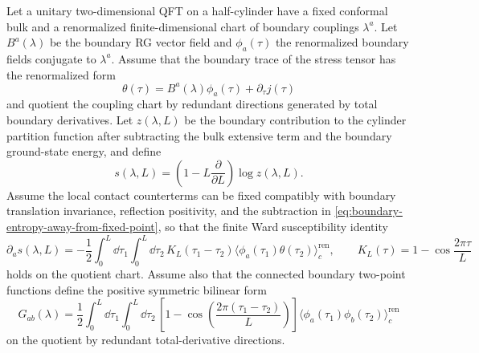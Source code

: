 \begin{hypothesis}
\label{hyp:boundary-entropy-gradient-input}
Let a unitary two-dimensional QFT on a half-cylinder have a fixed conformal
bulk and a renormalized finite-dimensional chart of boundary couplings
\(\lambda^a\).  Let \(B^a(\lambda)\) be the boundary RG vector field and
\(\phi_a(\tau)\) the renormalized boundary fields conjugate to
\(\lambda^a\).  Assume that the boundary trace of the stress tensor has the
renormalized form
\begin{equation}
  \theta(\tau)
  =
  B^a(\lambda)\phi_a(\tau)+\partial_\tau j(\tau)
  \label{eq:boundary-trace-beta-fields}
\end{equation}
and quotient the coupling chart by redundant directions generated by total
boundary derivatives.  Let \(z(\lambda,L)\) be the boundary contribution to
the cylinder partition function after subtracting the bulk extensive term and
the boundary ground-state energy, and define
\begin{equation}
  s(\lambda,L)
  =
  \left(1-L\frac{\partial}{\partial L}\right)\log z(\lambda,L).
  \label{eq:boundary-entropy-away-from-fixed-point}
\end{equation}
Assume the local contact counterterms can be fixed compatibly with boundary
translation invariance, reflection positivity, and the subtraction in
\eqref{eq:boundary-entropy-away-from-fixed-point}, so that the finite Ward
susceptibility identity
\begin{equation}
  \partial_a s(\lambda,L)
  =
  -\frac12
  \int_0^L\!\dd\tau_1
  \int_0^L\!\dd\tau_2\,
  K_L(\tau_1-\tau_2)
  \bigl\langle
    \phi_a(\tau_1)\theta(\tau_2)
  \bigr\rangle_{\!c}^{\mathrm{ren}},
  \qquad
  K_L(\tau)=1-\cos\frac{2\pi\tau}{L}
  \label{eq:bcft-gradient-ward-susceptibility}
\end{equation}
holds on the quotient chart.  Assume also that the connected boundary
two-point functions define the positive symmetric bilinear form
\begin{equation}
  G_{ab}(\lambda)
  =
  \frac12
  \int_0^L\!\dd\tau_1
  \int_0^L\!\dd\tau_2\,
  \left[
    1-\cos\!\left(\frac{2\pi(\tau_1-\tau_2)}{L}\right)
  \right]
  \bigl\langle\phi_a(\tau_1)\phi_b(\tau_2)\bigr\rangle_{\!c}^{\mathrm{ren}}
  \label{eq:boundary-gradient-metric}
\end{equation}
on the quotient by redundant total-derivative directions.
\end{hypothesis}

